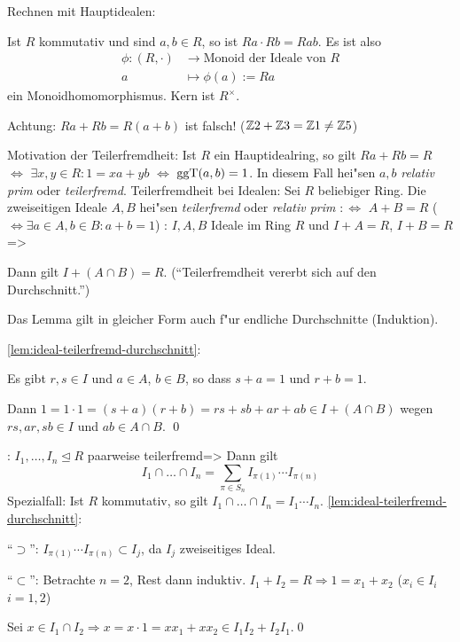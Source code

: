 \example Rechnen mit Hauptidealen:{
  Ist $R$ kommutativ und sind $a,b\in R$, so ist $Ra\cdot Rb=Rab$.
  Es ist also 
  \begin{align*}
    \phi:(R,\cdot)&\to \text{Monoid der Ideale von $R$}\\
    a&\mapsto \phi(a):=Ra
    \end{align*}
  ein Monoidhomomorphismus. Kern ist $R^\times$.
  
  Achtung: $Ra+Rb=R(a+b)$ ist falsch! ($\mathbb Z2+\mathbb Z3=\mathbb Z1\neq\mathbb Z5$)
  }
\remark Motivation der Teilerfremdheit:{
  Ist $R$ ein Hauptidealring, so gilt $Ra+Rb=R$ $\iff$
  $\exists x,y\in R:1=xa+yb$ $\iff$ $\operatorname{ggT}(a,b)=1$. In diesem Fall hei"sen
  $a,b$ \emph{relativ prim} oder \emph{teilerfremd}.
  }
 Teilerfremdheit bei Idealen:{
  Sei $R$ beliebiger Ring. Die zweiseitigen Ideale $A,B$ hei"sen
  \emph{teilerfremd} oder \emph{relativ prim} $:\iff$ $A+B=R$
  ($\iff \exists a\in A,b\in B: a+b=1$)
  }
\lemma:
  $I,A,B$ Ideale im Ring $R$ und $I+A=R$, $I+B=R$=>{
  \label{lem:ideal-teilefremd-durchschnitt}
  Dann gilt $I+(A\cap B)=R$. 
  (``Teilerfremdheit vererbt sich auf den Durchschnitt.'')
  
  Das Lemma gilt in gleicher Form auch f"ur endliche Durchschnitte (Induktion).
  }
\proof \ref{lem:ideal-teilerfremd-durchschnitt}:{
  Es gibt $r,s\in I$ und $a\in A$, $b\in B$, so dass $s+a=1$ und $r+b=1$.
  
  Dann $1=1\cdot 1=(s+a)(r+b)=rs+sb+ar+ab\in I+(A\cap B)$ wegen
  $rs,ar,sb\in I$ und $ab\in A\cap B$. \qed
  }
\lemma:
  $I_1,\ldots,I_n\unlhd R$ paarweise teilerfremd=>{
  \label{lem:ideal-teilerfremd-durchschnitt}
  Dann gilt
  \[I_1\cap \ldots \cap I_n=\sum_{\pi\in S_n} I_{\pi(1)}\cdots I_{\pi(n)}
    \]
  Spezialfall: Ist $R$ kommutativ, so gilt $I_1\cap \ldots \cap I_n=I_{1}\cdots I_{n}$.
  }
\proof \ref{lem:ideal-teilerfremd-durchschnitt}:{
  ``$\supset$'': $I_{\pi(1)}\cdots I_{\pi(n)}\subset I_j$, da $I_j$ zweiseitiges Ideal.
  
  ``$\subset$'': Betrachte $n=2$, Rest dann induktiv.
  $I_1+I_2=R \Rightarrow 1=x_1+x_2$ ($x_i\in I_i$ $i=1,2$)
  
  Sei $x\in I_1\cap I_2\Rightarrow x=x\cdot 1=xx_1+xx_2\in I_1I_2+I_2I_1$.\qed
  }
